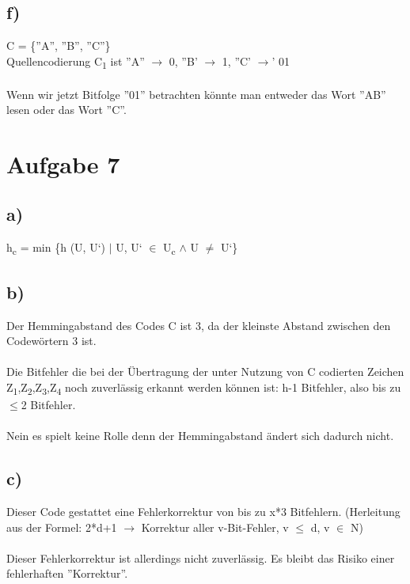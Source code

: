 \documentclass[a4paper,12pt]{scrartcl}
\begin{document}
\subsection{f)}
C = \{''A'', ''B'', ''C''\}\\
Quellencodierung C\textsubscript{1} ist ''A'' $\rightarrow$ 0, ''B' $\rightarrow$ 1, ''C' $\rightarrow$' 01\\\\
Wenn wir jetzt Bitfolge ''01'' betrachten könnte man entweder das Wort ''AB'' lesen oder das Wort ''C''.

\section{Aufgabe 7}
\subsection{a)}
h\textsubscript{c} = min \{h (U, U‘) $\vert$ U, U‘ $\in$ U\textsubscript{c} $\wedge$ U $\not=$ U‘\}

\subsection{b)}
Der Hemmingabstand des Codes C ist 3, da der kleinste Abstand zwischen den Codewörtern 3 ist. \\\\
Die Bitfehler die bei der Übertragung der unter Nutzung von C codierten Zeichen Z\textsubscript{1},Z\textsubscript{2},Z\textsubscript{3},Z\textsubscript{4} noch zuverlässig erkannt werden können ist: h-1 Bitfehler, also bis zu $\leq$2 Bitfehler.\\\\
Nein es spielt keine Rolle denn der Hemmingabstand ändert sich dadurch nicht.

\subsection{c)}
Dieser Code gestattet eine Fehlerkorrektur von bis zu x*3 Bitfehlern. (Herleitung aus der Formel: 2*d+1 $\rightarrow$ Korrektur aller v-Bit-Fehler, v $\leq$ d, v $\in$ N)\\\\
Dieser Fehlerkorrektur ist allerdings nicht zuverlässig. Es bleibt das Risiko einer fehlerhaften ''Korrektur''.
\end{document}
